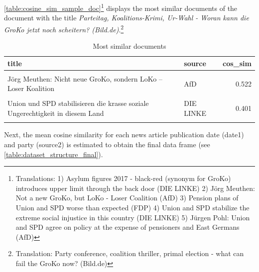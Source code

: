 \documentclass[
  12pt,
]{article}
\begin{document}
\autoref{table:cosine_sim_sample_doc}\footnote{Translations: 1) Asylum
  figures 2017 - black-red (synonym for GroKo) introduces upper limit
  through the back door (DIE LINKE) 2) Jörg Meuthen: Not a new GroKo,
  but LoKo - Loser Coalition (AfD) 3) Pension plans of Union and SPD
  worse than expected (FDP) 4) Union and SPD stabilize the extreme
  social injustice in this country (DIE LINKE) 5) Jürgen Pohl: Union and
  SPD agree on policy at the expense of pensioners and East Germans
  (AfD)} displays the most similar documents of the document with the
title \emph{Parteitag, Koalitions-Krimi, Ur-Wahl - Woran kann die GroKo
jetzt noch scheitern? (Bild.de)}.\footnote{Translation: Party
  conference, coalition thriller, primal election - what can fail the
  GroKo now? (Bild.de)}

\begin{table}[H]

\caption{\label{tab:Documents with highest similarity}Most similar documents \label{table:cosine_sim_sample_doc}}
\centering
\fontsize{7}{9}\selectfont
\begin{tabular}[t]{llr}
\toprule
title & source & cos\_sim\\
\midrule
\cellcolor{gray!6}{Asylzahlen 2017 - schwarz-rot führt Obergrenze durch die Hintertür ein} & \cellcolor{gray!6}{DIE LINKE} & \cellcolor{gray!6}{0.542}\\
Jörg Meuthen: Nicht neue GroKo, sondern LoKo – Loser Koalition & AfD & 0.522\\
\cellcolor{gray!6}{Rentenpläne von Union und SPD schlimmer als erwartet} & \cellcolor{gray!6}{FDP} & \cellcolor{gray!6}{0.478}\\
Union und SPD stabilisieren die krasse soziale Ungerechtigkeit in diesem Land & DIE LINKE & 0.401\\
\cellcolor{gray!6}{Jürgen Pohl: Union und SPD verabreden Politik zu Lasten von Rentnern und Ostdeutschen} & \cellcolor{gray!6}{AfD} & \cellcolor{gray!6}{0.388}\\
\bottomrule
\end{tabular}
\end{table}

Next, the mean cosine similarity for each news article publication date
(date1) and party (source2) is estimated to obtain the final data frame
(see \autoref{table:dataset_structure_final}).
\end{document}
